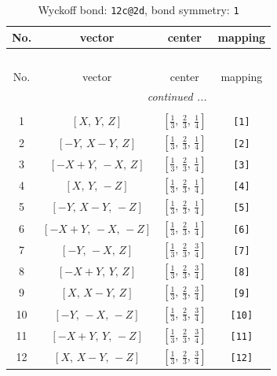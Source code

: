 \documentclass[fleqn,8pt]{jsarticle}
\begin{document}
\renewcommand{\arraystretch}{1.2}
\begin{longtable}{cccc}
\caption{Wyckoff bond: {\tt 12c@2d}, bond symmetry: {\tt 1}}
 \\
 \hline \hline
No. & vector & center & mapping \\ \hline \endfirsthead

\multicolumn{3}{l}{\tablename\ \thetable{}} \\
 \hline \hline
No. & vector & center & mapping \\ \hline \endhead

 \hline \hline
\multicolumn{3}{r}{\footnotesize\it continued ...} \\ \endfoot

 \hline \hline
\multicolumn{3}{r}{} \\ \endlastfoot

1 & $\left[ X,\, Y,\, Z \right]$ & $\left[ \frac{1}{3},\, \frac{2}{3},\, \frac{1}{4} \right]$ & {\tt [1]} \\ \hline
2 & $\left[ - Y,\, X - Y,\, Z \right]$ & $\left[ \frac{1}{3},\, \frac{2}{3},\, \frac{1}{4} \right]$ & {\tt [2]} \\ \hline
3 & $\left[ - X + Y,\, - X,\, Z \right]$ & $\left[ \frac{1}{3},\, \frac{2}{3},\, \frac{1}{4} \right]$ & {\tt [3]} \\ \hline
4 & $\left[ X,\, Y,\, - Z \right]$ & $\left[ \frac{1}{3},\, \frac{2}{3},\, \frac{1}{4} \right]$ & {\tt [4]} \\ \hline
5 & $\left[ - Y,\, X - Y,\, - Z \right]$ & $\left[ \frac{1}{3},\, \frac{2}{3},\, \frac{1}{4} \right]$ & {\tt [5]} \\ \hline
6 & $\left[ - X + Y,\, - X,\, - Z \right]$ & $\left[ \frac{1}{3},\, \frac{2}{3},\, \frac{1}{4} \right]$ & {\tt [6]} \\ \hline
7 & $\left[ - Y,\, - X,\, Z \right]$ & $\left[ \frac{1}{3},\, \frac{2}{3},\, \frac{3}{4} \right]$ & {\tt [7]} \\ \hline
8 & $\left[ - X + Y,\, Y,\, Z \right]$ & $\left[ \frac{1}{3},\, \frac{2}{3},\, \frac{3}{4} \right]$ & {\tt [8]} \\ \hline
9 & $\left[ X,\, X - Y,\, Z \right]$ & $\left[ \frac{1}{3},\, \frac{2}{3},\, \frac{3}{4} \right]$ & {\tt [9]} \\ \hline
10 & $\left[ - Y,\, - X,\, - Z \right]$ & $\left[ \frac{1}{3},\, \frac{2}{3},\, \frac{3}{4} \right]$ & {\tt [10]} \\ \hline
11 & $\left[ - X + Y,\, Y,\, - Z \right]$ & $\left[ \frac{1}{3},\, \frac{2}{3},\, \frac{3}{4} \right]$ & {\tt [11]} \\ \hline
12 & $\left[ X,\, X - Y,\, - Z \right]$ & $\left[ \frac{1}{3},\, \frac{2}{3},\, \frac{3}{4} \right]$ & {\tt [12]} \\
\end{longtable}
\end{document}
